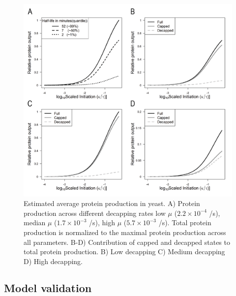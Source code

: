 \documentclass[review]{elsarticle}
\begin{document}
 
\begin{figure}[!ht]
\centering
\includegraphics[width = 135mm]{Images/2023-07-17_Protein_Production_v2.png}
\caption{Estimated average protein production in yeast.  A) Protein production across different decapping rates  low $\mu$ ($2.2\times 10^{-4}$ /s), median $\mu$ ($1.7\times 10^{-3}$ /s), high $\mu$ ($5.7\times 10^{-3}$ /s). Total protein production is normalized to the maximal protein production across all parameters. B-D) Contribution of capped and decapped states to total protein production. B) Low decapping C) Medium decapping D) High decapping. }
\end{figure}
\clearpage

\subsection{Model validation}
\end{document}
